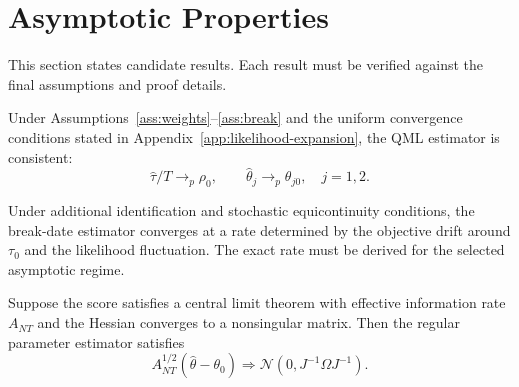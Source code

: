 \section{Asymptotic Properties}\label{sec:asymptotic-properties}

This section states candidate results. Each result must be verified against the final assumptions and proof details.

\begin{theorem}[Consistency]\label{thm:consistency}
Under Assumptions~\ref{ass:weights}--\ref{ass:break} and the uniform convergence conditions stated in Appendix~\ref{app:likelihood-expansion}, the QML estimator is consistent:
\[
\widehat\tau/T \to_p \rho_0,
\qquad
\widehat\theta_j \to_p \theta_{j0},\quad j=1,2.
\]
\end{theorem}

\begin{theorem}\label{thm:break-rate}
Under additional identification and stochastic equicontinuity conditions, the break-date estimator converges at a rate determined by the objective drift around $\tau_0$ and the likelihood fluctuation. The exact rate must be derived for the selected asymptotic regime.
\end{theorem}

\begin{theorem}\label{thm:asymptotic-normality}
Suppose the score satisfies a central limit theorem with effective information rate $A_{NT}$ and the Hessian converges to a nonsingular matrix. Then the regular parameter estimator satisfies
\[
A_{NT}^{1/2}(\widehat\theta-\theta_0)\Rightarrow \mathcal{N}(0,J^{-1}\Omega J^{-1}).
\]
\end{theorem}


